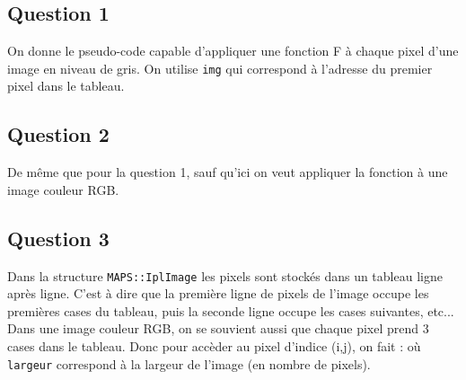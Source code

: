 \subsection{Question 1}
On donne le pseudo-code capable d'appliquer une fonction F à chaque pixel d'une image en niveau de gris. On utilise \lstinline{img} qui correspond à l'adresse du premier pixel dans le tableau.
\noindent{}

\subsection{Question 2}
De même que pour la question 1, sauf qu'ici on veut appliquer la fonction à une image couleur RGB.\\
\noindent{}

\subsection{Question 3}
Dans la structure \lstinline{MAPS::IplImage} les pixels sont stockés dans un tableau ligne après ligne. C'est à dire que la première ligne de pixels de l'image occupe les premières cases du tableau, puis la seconde ligne occupe les cases suivantes, etc...
Dans une image couleur RGB, on se souvient aussi que chaque pixel prend 3 cases dans le tableau.
Donc pour accèder au pixel d'indice (i,j), on fait :
\noindent{}
où \lstinline{largeur} correspond à la largeur de l'image (en nombre de pixels).

